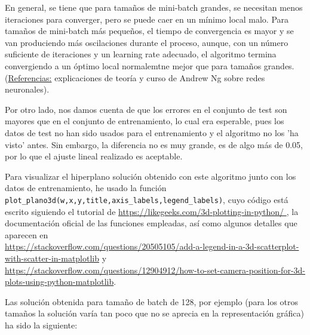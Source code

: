 \documentclass[a4]{article}
\begin{document}
En general, se tiene que para tamaños de mini-batch grandes, se necesitan menos iteraciones para converger, pero se puede caer en un mínimo local malo. Para tamaños de mini-batch más pequeños, el tiempo de convergencia es mayor y se van produciendo más oscilaciones durante el proceso, aunque, con un número suficiente de iteraciones y un learning rate adecuado, el algoritmo termina convergiendo a un óptimo local normalemtne mejor que para tamaños grandes. \\
(\underline{Referencias:} explicaciones de teoría y curso de Andrew Ng sobre redes neuronales).

Por otro lado, nos damos cuenta de que los errores en el conjunto de test son mayores que en el conjunto de entrenamiento, lo cual era esperable, pues los datos de test no han sido usados para el entrenamiento y el algoritmo no los 'ha visto' antes. Sin embargo, la diferencia no es muy grande, es de algo más de 0.05, por lo que el ajuste lineal realizado es aceptable.


Para visualizar el hiperplano solución obtenido con este algoritmo junto con los datos de entrenamiento, he usado la función \lstinline|plot_plano3d(w,x,y,title,axis_labels,legend_labels)|, cuyo código está escrito siguiendo el tutorial de \href{https://likegeeks.com/3d-plotting-in-python/ }{https://likegeeks.com/3d-plotting-in-python/ }, la documentación oficial de las funciones empleadas, así como algunos detalles que aparecen en \\
\href{https://stackoverflow.com/questions/20505105/add-a-legend-in-a-3d-scatterplot-with-scatter-in-matplotlib}{https://stackoverflow.com/questions/20505105/add-a-legend-in-a-3d-scatterplot-with-scatter-in-matplotlib} y\\
 \href{https://stackoverflow.com/questions/12904912/how-to-set-camera-position-for-3d-plots-using-python-matplotlib}{https://stackoverflow.com/questions/12904912/how-to-set-camera-position-for-3d-plots-using-python-matplotlib}.
 
 Las solución obtenida para tamaño de batch de 128, por ejemplo (para los otros tamaños la solución varía tan poco que no se aprecia en la representación gráfica) ha sido la siguiente:
 
\end{document}
